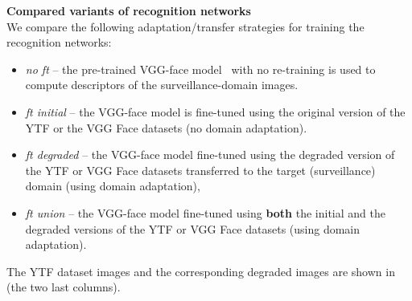 \bigskip\indent\textbf{Compared variants of recognition networks} \\
\label{sect:ft}
We compare the following adaptation/transfer strategies for training the recognition networks:
\begin{itemize}

\item \textit{no ft} -- the pre-trained VGG-face model~\cite{parkhi2015deep} with no re-training is used to compute descriptors of the surveillance-domain images.


\item \textit{ft initial} -- the VGG-face model is fine-tuned using the original version of the YTF or the VGG Face datasets (no domain adaptation). 

\item \textit{ft degraded} -- the VGG-face model fine-tuned using the degraded version of the YTF or VGG Face datasets transferred to the target (surveillance) domain (using domain adaptation),

\item \textit{ft union} -- the VGG-face model fine-tuned using \textbf{both} the initial and the degraded versions  of the YTF or VGG Face datasets (using domain adaptation). 

\end{itemize}

The YTF dataset images and the corresponding degraded images are shown  in  (the two last columns).




